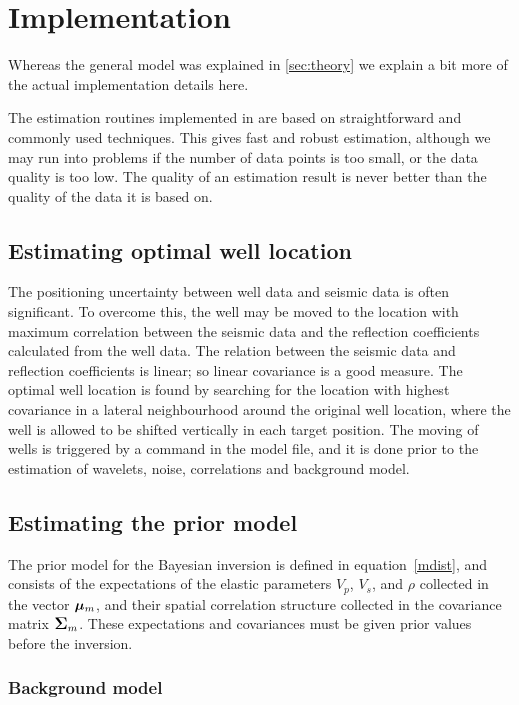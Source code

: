 \chapter{Implementation}
\label{sec:implementation}

Whereas the general model was explained in \autoref{sec:theory} we
explain a bit more of the actual implementation details here.

The estimation routines implemented in \crava are based on
straightforward and commonly used techniques. This gives fast and
robust estimation, although we may run into problems if the number of
data points is too small, or the data quality is too low. The quality
of an estimation result is never better than the quality of the data
it is based on.

\section{Estimating optimal well location}
The positioning uncertainty between well data and seismic data is
often significant. To overcome this, the well may be moved to the
location with maximum correlation between the seismic data and the
reflection coefficients calculated from the well data. The relation
between the seismic data and reflection coefficients is linear; so
linear covariance is a good measure. The optimal well location is
found by searching for the location with highest covariance in a
lateral neighbourhood around the original well location, where the well
is allowed to be shifted vertically in each target position. The
moving of wells is triggered by a command in the model file, and it is
done prior to the estimation of wavelets, noise, correlations and
background model.

\section{Estimating the prior model}

The prior model for the Bayesian inversion is defined in
equation~\eqref{mdist}, and consists of the expectations of the
elastic parameters $V_p$, $V_s$, and $\rho$ collected in the vector
$\bm\mu_m$, and their spatial correlation structure collected in the
covariance matrix $\mbox{\large\ensuremath{\boldsymbol{\Sigma}}}_m$. These expectations and covariances must
be given prior values before the inversion.

\subsection{Background model}
\label{sec:backgroundmodel}

